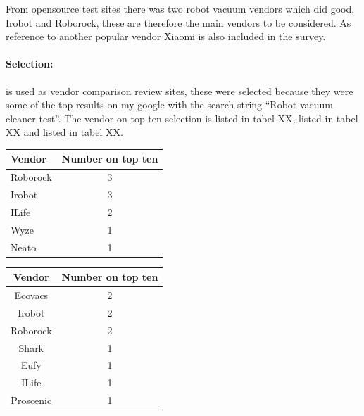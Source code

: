  From opensource test sites there was two robot vacuum vendors which did good, Irobot and Roborock, these are therefore the main vendors to be considered. As reference to another popular vendor Xiaomi is also included in the survey.\cite{robotsel11}\cite{robotsel12}\cite{robotsel13}

\paragraph{Selection:} \cite{robotsel11}\cite{robotsel12}\cite{robotsel13} is used as vendor comparison review sites, these were selected because they were some of the top results on my google with the search string “Robot vacuum cleaner test”. The vendor on top ten selection \cite{robotsel11} is listed in tabel XX, \cite{robotsel12} listed in tabel XX and \cite{robotsel13} listed in tabel XX. 

\begin{table}[]
\begin{tabular}{|l|c|}
\hline
Vendor   & Number on top ten \\ \hline
Roborock & 3                 \\ \hline
Irobot   & 3                 \\ \hline
ILife    & 2                 \\ \hline
Wyze     & 1                 \\ \hline
Neato    & 1                 \\ \hline
\end{tabular}
\end{table}


\begin{table}[]
\begin{tabular}{|c|c|}
\hline
Vendor    & Number on top ten \\ \hline
Ecovacs   & 2                 \\ \hline
Irobot    & 2                 \\ \hline
Roborock  & 2                 \\ \hline
Shark     & 1                 \\ \hline
Eufy      & 1                 \\ \hline
ILife     & 1                 \\ \hline
Proscenic & 1                 \\ \hline
\end{tabular}
\end{table}

